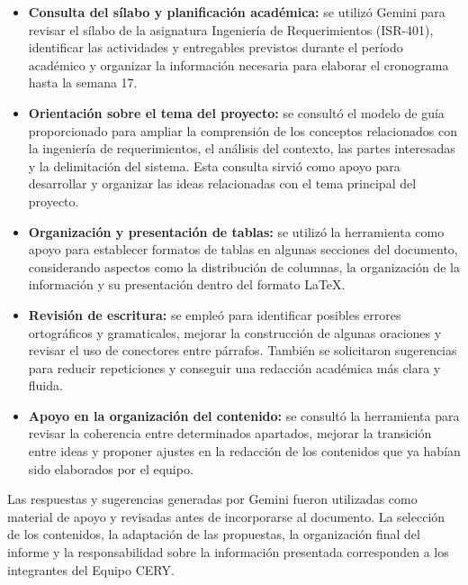 \documentclass[11pt,a4paper]{article}
\begin{document}
\begin{itemize}

    \item \textbf{Consulta del sílabo y planificación académica:} se utilizó Gemini para revisar el sílabo de la asignatura Ingeniería de Requerimientos (ISR-401), identificar las actividades y entregables previstos durante el período académico y organizar la información necesaria para elaborar el cronograma hasta la semana 17.

    \item \textbf{Orientación sobre el tema del proyecto:} se consultó el modelo de guía proporcionado para ampliar la comprensión de los conceptos relacionados con la ingeniería de requerimientos, el análisis del contexto, las partes interesadas y la delimitación del sistema. Esta consulta sirvió como apoyo para desarrollar y organizar las ideas relacionadas con el tema principal del proyecto.

    \item \textbf{Organización y presentación de tablas:} se utilizó la herramienta como apoyo para establecer formatos de tablas en algunas secciones del documento, considerando aspectos como la distribución de columnas, la organización de la información y su presentación dentro del formato LaTeX.

    \item \textbf{Revisión de escritura:} se empleó para identificar posibles errores ortográficos y gramaticales, mejorar la construcción de algunas oraciones y revisar el uso de conectores entre párrafos. También se solicitaron sugerencias para reducir repeticiones y conseguir una redacción académica más clara y fluida.

    \item \textbf{Apoyo en la organización del contenido:} se consultó la herramienta para revisar la coherencia entre determinados apartados, mejorar la transición entre ideas y proponer ajustes en la redacción de los contenidos que ya habían sido elaborados por el equipo.

\end{itemize}

Las respuestas y sugerencias generadas por Gemini fueron utilizadas como material de apoyo y revisadas antes de incorporarse al documento. La selección de los contenidos, la adaptación de las propuestas, la organización final del informe y la responsabilidad sobre la información presentada corresponden a los integrantes del Equipo CERY.
\end{document}
